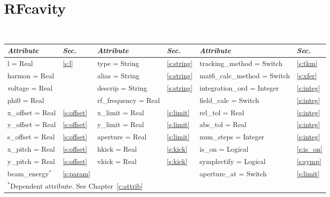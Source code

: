 {{%
\section{RFcavity}
\label{s:rfcav}

\begin{center}
\tt
\begin{tabular}{|l|l||l|l||l|l|} \hline
  {\sl Attribute} & {\sl Sec.}  & {\sl Attribute} & {\sl Sec.} & {\sl Attribute} & {\sl Sec.} \\ \hline
  l        = Real     & \ref{s:l}      & type = String      & \ref{s:string} & tracking\_method = Switch   & \ref{s:tkm}   \\ \hline
  harmon   = Real     &                & alias = String     & \ref{s:string} & mat6\_calc\_method = Switch & \ref{s:xfer}  \\ \hline
  voltage  = Real     &                & descrip = String   & \ref{s:string} & integration\_ord = Integer  & \ref{s:integ} \\ \hline
  phi0     = Real     &                & rf\_frequency = Real &              & field\_calc = Switch        & \ref{s:integ} \\ \hline
  x\_offset  = Real   & \ref{s:offset} & x\_limit = Real    & \ref{s:limit}  & rel\_tol = Real             & \ref{s:integ} \\ \hline
  y\_offset  = Real   & \ref{s:offset} & y\_limit = Real    & \ref{s:limit}  & abs\_tol = Real             & \ref{s:integ} \\ \hline
  s\_offset  = Real   & \ref{s:offset} & aperture = Real    & \ref{s:limit}  & num\_steps = Integer        & \ref{s:integ} \\ \hline
  x\_pitch = Real     & \ref{s:offset} & hkick    = Real    & \ref{s:kick}   & is\_on = Logical            & \ref{s:is_on} \\ \hline
  y\_pitch = Real     & \ref{s:offset} & vkick    = Real    & \ref{s:kick}   & symplectify = Logical       & \ref{s:symp}  \\ \hline
  beam\_energy$^*$    & \ref{s:param}  &                    &                & aperture\_at = Switch       & \ref{s:limit} \\ \hline
  \multicolumn{6}{l}{\small $^*$Dependent attribute. See Chapter~\ref{c:attrib}} \\
\end{tabular}
\end{center}
\toffset

}}
